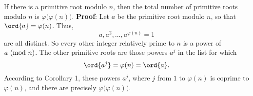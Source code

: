 \begin{Proposition}{}{}
    If there is a primitive root modulo $ n $, then the total number of
    primitive roots modulo $ n $ is $ \varphi\bigl(\varphi(n)\bigr) $.
    \tcblower{}
    \textbf{Proof}: Let $ a $ be the primitive root modulo $ n $, so that $ \ord{a}=\varphi(n) $. Thus,
    \[ a,a^2,\ldots,a^{\varphi(n)}=1 \]
    are all distinct. So every other integer relatively prime to $ n $ is a power of $ a\ (\mathrm{mod}\ n) $.
    The other primitive roots are those powers $ a^j $ in the list for which
    \[ \ord{a^j}=\varphi(n)=\ord{a}. \]
    According to Corollary 1, these powers $ a^j $, where $ j $ from $ 1 $ to $ \varphi(n) $ is coprime to $ \varphi(n) $,
    and there are precisely $ \varphi\bigl(\varphi(n)\bigr) $.
\end{Proposition}